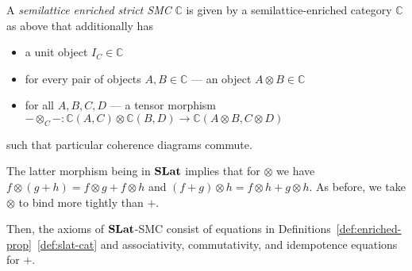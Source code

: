 \begin{definition}\label{def:enriched-prop}
    A \textit{semilattice enriched strict SMC}  $\mathbb{C}$ is given by a semilattice-enriched category $\mathbb{C}$ as above that additionally has
    \begin{itemize}
    \item a unit object $I_{C} \in \mathbb{C}$
    \item for every pair of objects $A,B \in \mathbb{C}$ --- an object $A \otimes B \in \mathbb{C}$
    \item for all $A,B,C,D$ --- a tensor morphism $ - \otimes_{C} - : \mathbb{C}(A,C) \otimes \mathbb{C}(B,D) \to \mathbb{C}(A \otimes B, C \otimes D)$
    \end{itemize}
    such that particular coherence diagrams commute.
    \end{definition}
    The latter morphism being in $\mathbf{SLat}$ implies that for $\otimes$ we have 
    $
    f \otimes (g+h) = f \otimes g + f \otimes h $ and $ (f+g) \otimes h = f \otimes h + g \otimes h
    $.
    As before, we take $\otimes$ to bind more tightly than $+$.

    Then, the axioms of $\mathbf{SLat}$-SMC consist of equations in Definitions~\ref{def:enriched-prop}~\ref{def:slat-cat} and associativity, commutativity, and idempotence equations for $+$.
    
